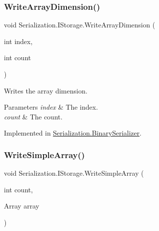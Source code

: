 \mbox{\label{interface_serialization_1_1_i_storage_a844c1dfe7f787cbf76d0521ca4ea11ef}} 
\subsubsection{\texorpdfstring{Write\+Array\+Dimension()}{WriteArrayDimension()}}
{\footnotesize\ttfamily void Serialization.\+I\+Storage.\+Write\+Array\+Dimension (\begin{DoxyParamCaption}\item[{int}]{index,  }\item[{int}]{count }\end{DoxyParamCaption})}



Writes the array dimension. 


\begin{DoxyParams}{Parameters}
{\em index} & The index.\\
\hline
{\em count} & The count.\\
\hline
\end{DoxyParams}


Implemented in \hyperlink{class_serialization_1_1_binary_serializer_adf00734419149ffd0f8999876c1120b0}{Serialization.\+Binary\+Serializer}.

\mbox{\label{interface_serialization_1_1_i_storage_a94937afa442d505b3802f9dd19675ee2}} 
\subsubsection{\texorpdfstring{Write\+Simple\+Array()}{WriteSimpleArray()}}
{\footnotesize\ttfamily void Serialization.\+I\+Storage.\+Write\+Simple\+Array (\begin{DoxyParamCaption}\item[{int}]{count,  }\item[{Array}]{array }\end{DoxyParamCaption})}



